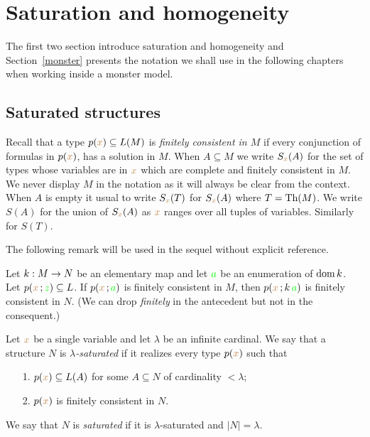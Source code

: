 \documentclass[creche.tex]{subfiles}
\begin{document}
\chapter{Saturation and homogeneity}
\label{saturation}
 
\def\medrel#1{\parbox{6ex}{$\displaystyle\hfil #1$}}
\def\ceq#1#2#3{\parbox[b]{25ex}{$\displaystyle #1$}\medrel{#2}$\displaystyle  #3$}

The first two section introduce saturation and homogeneity and Section~\ref{monster} presents the notation we shall use in the following chapters when working inside a monster model.

\section{Saturated structures}

Recall that a type $p({\color{brown} x})\subseteq L(M)$ is \emph{finitely consistent in $M$\/} if every conjunction of formulas in $p({\color{brown} x})$, has a solution in $M$. When $A\subseteq M$ we write $S_{\color{brown} x}(A)$ for the set of types whose variables are in ${\color{brown} x}$ which are complete and finitely consistent in $M$. We never display $M$ in the notation as it will always be clear from the context. When $A$ is empty it usual to write $S_{\color{brown} x}(T)$ for $S_{\color{brown} x}(A)$ where $T=\textrm{Th}(M)$. We write $S(A)$ for the union of $S_{\color{brown} x}(A)$ as ${\color{brown} x}$ ranges over all tuples of variables. Similarly for $S(T)$.

The following remark will be used in the sequel without explicit reference.

\begin{remark}
Let $k:M\rightarrow N$ be an elementary map and let ${\color{green} a}$ be an enumeration of $\mathop{\rm dom} k$. Let $p({\color{brown} x}\,;{\color{green} z})\subseteq L$. If $p({\color{brown} x}\,;{\color{green} a})$ is finitely consistent in $M$, then $p({\color{brown} x}\,;k\,{\color{green} a})$ is finitely consistent in $N$. (We can drop \textit{finitely} in the antecedent but not in the consequent.)\QED
\end{remark}

\begin{definition}
Let ${\color{brown} x}$ be a single variable and let $\lambda$ be an infinite cardinal. We say that a structure $N$ is \emph{$\lambda$-saturated} if it realizes every type $p({\color{brown} x})$ such that
\begin{itemize}
\item[1.]  $p({\color{brown} x})\subseteq L(A)$ for some $A\subseteq N$ of cardinality $<\lambda$;
\item[2.] $p({\color{brown} x})$ is finitely consistent in $N$.
\end{itemize}
We say that $N$ is \emph{saturated\/} if it is $\lambda$-saturated and $|N|=\lambda$.
\end{definition}
\end{document}
